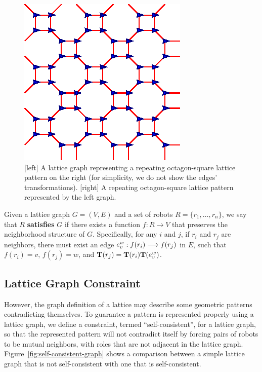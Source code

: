 \begin{figure}
    \centering
    \begin{minipage}[b]{0.45\linewidth}
        \centering
        
    \end{minipage}
    \begin{minipage}[b]{0.45\linewidth}
        \centering
        \includegraphics[scale=0.95]{figs/octsq-lat}
    \end{minipage}
    \caption{[left] A lattice graph representing a repeating octagon-square lattice pattern on the right (for simplicity, we do not show the edges' transformations). [right] A repeating octagon-square lattice pattern represented by the left graph.}
    \label{fig:octagonsquare}
\end{figure}


\begin{defn}
  Given a lattice graph $G=(V, E)$ and a set of robots
    $R = \{ r_1, \ldots, r_n \}$,
  we say that $R$ \textbf{satisfies} $G$ if there exists a function
    $f: R \rightarrow V$
  that preserves the neighborhood structure of $G$.
  Specifically, for any $i$ and $j$, if $r_i$ and $r_j$ are neighbors, 
  there must exist an edge
  $e_v^w: {f(r_i)}\overset{}{\longrightarrow}{f(r_j)}$ in $E$, such that 
      $f(r_i) = v$,
      $f(r_j) = w$, and $\mathbf{T}(r_j) = \mathbf{T}(r_i) \mathbf{T}(e_{v}^w)$.
\end{defn}

\subsection{Lattice Graph Constraint}
However, the graph definition of a lattice may describe some geometric patterns contradicting themselves. 
To guarantee a pattern is represented properly using a lattice graph, we define a constraint, termed ``self-consistent'', for a lattice graph, so that the represented pattern will not contradict itself by forcing pairs of robots to be mutual neighbors, with roles that are not adjacent in the lattice graph. 
%
Figure~\ref{fig:self-consistent-graph} shows a comparison between a simple
lattice graph that is not self-consistent with one that is self-consistent.


